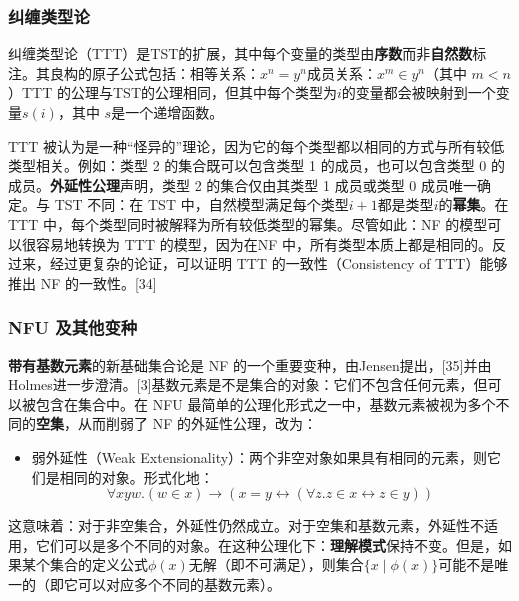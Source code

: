 \subsubsection{纠缠类型论}
纠缠类型论（TTT）是TST的扩展，其中每个变量的类型由\textbf{序数}而非\textbf{自然数}标注。其良构的原子公式包括：相等关系：\( x^n = y^n \)成员关系：\( x^m \in y^n \)（其中 \( m < n \)）TTT 的公理与TST的公理相同，但其中每个类型为\( i \)的变量都会被映射到一个变量\( s(i) \)，其中 \( s \)是一个递增函数。

TTT 被认为是一种“怪异的”理论，因为它的每个类型都以相同的方式与所有较低类型相关。例如：类型 2 的集合既可以包含类型 1 的成员，也可以包含类型 0 的成员。\textbf{外延性公理}声明，类型 2 的集合仅由其类型 1 成员或类型 0 成员唯一确定。与 TST 不同：在 TST 中，自然模型满足每个类型\( i+1 \)都是类型\( i \)的\textbf{幂集}。在 TTT 中，每个类型同时被解释为所有较低类型的幂集。尽管如此：NF 的模型可以很容易地转换为 TTT 的模型，因为在NF 中，所有类型本质上都是相同的。反过来，经过更复杂的论证，可以证明 TTT 的一致性（Consistency of TTT）能够推出 NF 的一致性。[34]
\subsubsection{NFU 及其他变种}
\textbf{带有基数元素}的新基础集合论是 NF 的一个重要变种，由Jensen提出，[35]并由Holmes进一步澄清。[3]基数元素是不是集合的对象：它们不包含任何元素，但可以被包含在集合中。在 NFU 最简单的公理化形式之一中，基数元素被视为多个不同的\textbf{空集}，从而削弱了 NF 的外延性公理，改为：
\begin{itemize}
\item 弱外延性（Weak Extensionality）：两个非空对象如果具有相同的元素，则它们是相同的对象。形式化地：
\[
\forall x y w . (w \in x) \to (x = y \leftrightarrow (\forall z . z \in x \leftrightarrow z \in y))~
\]
\end{itemize}
这意味着：对于非空集合，外延性仍然成立。对于空集和基数元素，外延性不适用，它们可以是多个不同的对象。在这种公理化下：\textbf{理解模式}保持不变。但是，如果某个集合的定义公式\(\phi(x)\)无解（即不可满足），则集合\(\{x \mid \phi(x)\}\)可能不是唯一的（即它可以对应多个不同的基数元素）。

